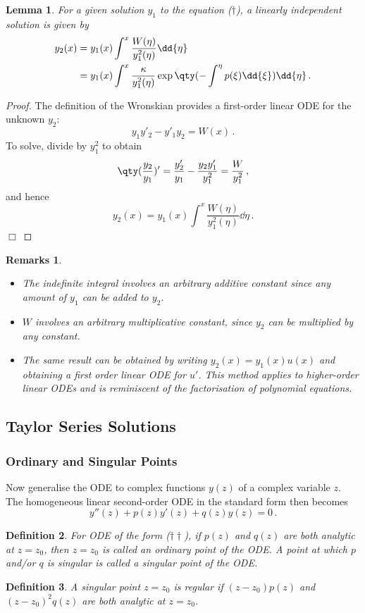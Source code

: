 \documentclass{article}
\theoremstyle{plain}\theoremheaderfont{\normalfont\itshape}\theorembodyfont{\rmfamily}\theoremseparator{.}\newtheorem*{rem}{Remark}\newtheorem*{ex}{Example}\newtheorem*{proof}{Proof}\newtheorem*{altp}{Alternative proof}
\theoremstyle{plain}\theoremheaderfont{\normalfont\bfseries}\theorembodyfont{\rmfamily}\theoremseparator{.}\newtheorem{thm}{Theorem}[section]\newtheorem{lem}[thm]{Lemma}\newtheorem{prop}[thm]{Proposition}\newtheorem*{cor}{Corollary}\newtheorem{defn}[thm]{Definition}\newtheorem{clm}[thm]{Claim}\newtheorem{clminproof}{Claim}
\theoremstyle{break}\theoremheaderfont{\normalfont\itshape}\theorembodyfont{\rmfamily}\theoremseparator{.\medskip}\newtheorem*{proofskip}{Proof}\newtheorem*{exs}{Examples}\newtheorem*{rems}{Remarks}
\theoremstyle{break}\theoremheaderfont{\normalfont\bfseries}\theorembodyfont{\rmfamily}\theoremseparator{.\medskip}\newtheorem{lemskip}[thm]{Lemma}\newtheorem{defnskip}[thm]{Definition}\newtheorem{propskip}[thm]{Proposition}\newtheorem{thmskip}[thm]{Theorem}
\numberwithin{equation}{section}
\newcommand{\qed}{\hfill\ensuremath{\Box}}
\begin{document}
	\begin{lem}
		For a given solution \(y_1\) to the equation (\(\dagger\)), a linearly independent solution is given by
		\begin{align*}
			y_2(x)&=y_1(x)\int^x\frac{W(\eta)}{y_1^2(\eta)}\dd{\eta}\\
			&=y_1(x)\int^x\frac{\kappa}{y_1^2(\eta)}\exp\qty(-\int^\eta p(\xi)\dd{\xi})\dd{\eta}\,.
		\end{align*}
	\end{lem}
	\begin{proof}
		The definition of the Wronskian provides a first-order linear ODE for the unknown \(y_2\):
		\[y_1y'_2-y'_1y_2=W(x)\,.\]
		To solve, divide by \(y_1^2\) to obtain
		\[\qty(\frac{y_2}{y_1})'=\frac{y'_2}{y_1}-\frac{y_2y'_1}{y_1^2}=\frac{W}{y_1^2}\,,\]
		and hence
		\[y_2(x)=y_1(x)\int^x\frac{W(\eta)}{y_1^2(\eta)}\dd{\eta}\,.\]\qed
	\end{proof}

	\begin{rems}
		\begin{itemize}[topsep=0pt]
			\item The indefinite integral involves an arbitrary additive constant since any amount of \(y_1\) can be added to \(y_2\).
			\item \(W\) involves an arbitrary multiplicative constant, since \(y_2\) can be multiplied by any constant.
			\item The same result can be obtained by writing \(y_2(x)=y_1(x)u(x)\) and obtaining a first order linear ODE for \(u'\). This method applies to higher-order linear ODEs and is reminiscent of the factorisation of polynomial equations.
		\end{itemize}
	\end{rems}

	\subsection{Taylor Series Solutions}
	\subsubsection{Ordinary and Singular Points}
	Now generalise the ODE to complex functions \(y(z)\) of a complex variable \(z\). The homogeneous linear second-order ODE in the standard form then becomes
	\begin{equation}\tag{\(\dagger\dagger\)}
		y''(z)+p(z)y'(z)+q(z)y(z)=0\,.
	\end{equation}
	\begin{defn}
		For ODE of the form (\(\dagger\dagger\)), if \(p(z)\) and \(q(z)\) are both analytic at \(z=z_0\), then \(z=z_0\) is called an \textit{ordinary point} of the ODE. A point at which \(p\) and/or \(q\) is singular is called a \textit{singular point} of the ODE.
	\end{defn}
	\begin{defn}
		A singular point \(z=z_0\) is \textit{regular} if \((z-z_0)p(z)\) and \((z-z_0)^2 q(z)\) are both analytic at \(z=z_0\).
	\end{defn}
\end{document}
